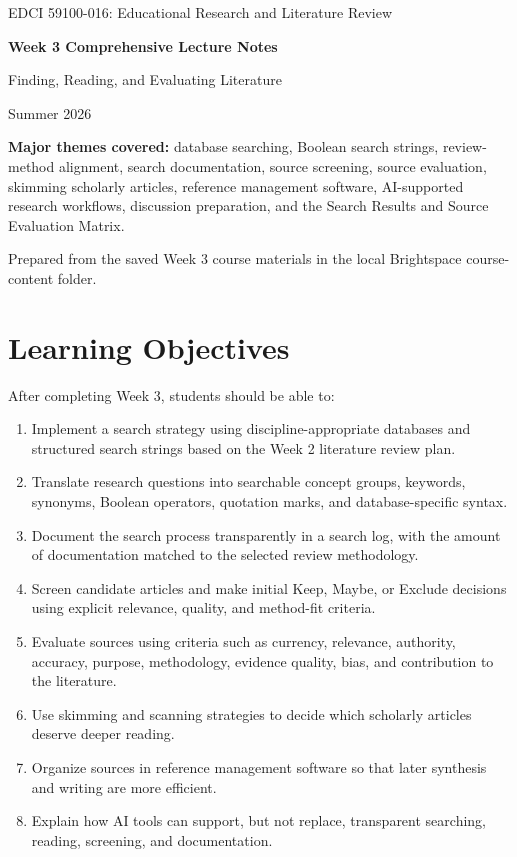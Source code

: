 \documentclass[11pt,letterpaper]{article}
\begin{document}
\begin{titlepage}
  \centering
  \vspace*{0.9in}
  {\Large EDCI 59100-016: Educational Research and Literature Review\par}
  \vspace{0.35in}
  {\Huge\bfseries Week 3 Comprehensive Lecture Notes\par}
  \vspace{0.2in}
  {\LARGE Finding, Reading, and Evaluating Literature\par}
  \vspace{0.55in}
  {\large Summer 2026\par}
  \vfill
  \begin{minipage}{0.82\linewidth}
  \centering
  \textbf{Major themes covered:} database searching, Boolean search strings, review-method alignment, search documentation, source screening, source evaluation, skimming scholarly articles, reference management software, AI-supported research workflows, discussion preparation, and the Search Results and Source Evaluation Matrix.
  \end{minipage}
  \vfill
  {\large Prepared from the saved Week 3 course materials in the local Brightspace course-content folder.\par}
\end{titlepage}

\tableofcontents
\newpage

\section{Learning Objectives}

After completing Week 3, students should be able to:

\begin{enumerate}
  \item Implement a search strategy using discipline-appropriate databases and structured search strings based on the Week 2 literature review plan.
  \item Translate research questions into searchable concept groups, keywords, synonyms, Boolean operators, quotation marks, and database-specific syntax.
  \item Document the search process transparently in a search log, with the amount of documentation matched to the selected review methodology.
  \item Screen candidate articles and make initial Keep, Maybe, or Exclude decisions using explicit relevance, quality, and method-fit criteria.
  \item Evaluate sources using criteria such as currency, relevance, authority, accuracy, purpose, methodology, evidence quality, bias, and contribution to the literature.
  \item Use skimming and scanning strategies to decide which scholarly articles deserve deeper reading.
  \item Organize sources in reference management software so that later synthesis and writing are more efficient.
  \item Explain how AI tools can support, but not replace, transparent searching, reading, screening, and documentation.
\end{enumerate}
\end{document}
